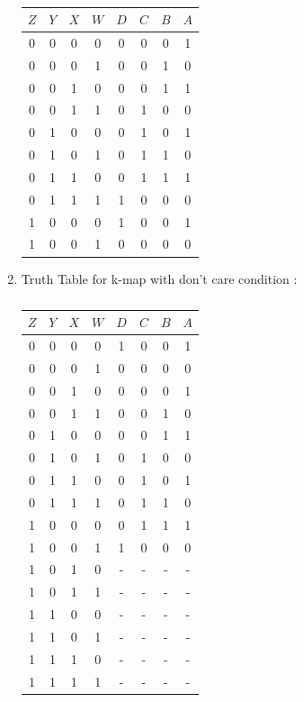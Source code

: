 \documentclass[conference]{IEEEtran}
\begin{document}
\begin{enumerate}
\begin{table}[htbp]
    \centering
\begin{tabular}
{ | c | c | c | c | c | c | c | c | } \hline
$Z$ & $Y$ & $X$ & $W$ & $D$ & $C$ & $B$ & $A$\\\hline
0   & 0   & 0   & 0   & 0  & 0 & 0  & 1 \\
0   & 0   & 0   & 1   & 0  & 0 & 1  & 0 \\
0   & 0   & 1   & 0   & 0  & 0 & 1  & 1 \\
0   & 0   & 1   & 1   & 0  & 1 & 0  & 0 \\
0   & 1   & 0   & 0   & 0  & 1 & 0  & 1 \\  
0   & 1   & 0   & 1   & 0  & 1 & 1  & 0 \\
0   & 1   & 1   & 0   & 0  & 1 & 1  & 1 \\  
0   & 1   & 1   & 1   & 1  & 0 & 0  & 0 \\
1   & 0   & 0   & 0   & 1  & 0 & 0  & 1 \\
1   & 0   & 0   & 1   & 0  & 0 & 0  & 0 \\ \hline
\end{tabular}
\vspace{0.1cm}
\caption{\label{tab:widgets}}
\end{table}

\item {Truth Table for k-map with don't care condition : }

\begin{table}[htbp]
    \centering
\begin{tabular}
{ | c | c | c | c | c | c | c | c | } \hline
$Z$ & $Y$ & $X$ & $W$ & $D$ & $C$ & $B$ & $A$\\\hline
0   & 0   & 0   & 0   & 1  & 0 & 0  & 1 \\
0   & 0   & 0   & 1   & 0  & 0 & 0  & 0 \\
0   & 0   & 1   & 0   & 0  & 0 & 0  & 1 \\
0   & 0   & 1   & 1   & 0  & 0 & 1  & 0 \\
0   & 1   & 0   & 0   & 0  & 0 & 1  & 1 \\  
0   & 1   & 0   & 1   & 0  & 1 & 0  & 0 \\
0   & 1   & 1   & 0   & 0  & 1 & 0  & 1 \\  
0   & 1   & 1   & 1   & 0  & 1 & 1  & 0 \\
1   & 0   & 0   & 0   & 0  & 1 & 1  & 1 \\
1   & 0   & 0   & 1   & 1  & 0 & 0  & 0 \\
1   & 0   & 1   & 0   & -  & - & -  & - \\ 
1   & 0   & 1   & 1   & -  & - & -  & - \\
1   & 1   & 0   & 0   & -  & - & -  & - \\
1   & 1   & 0   & 1   & -  & - & -  & - \\
1   & 1   & 1   & 0   & -  & - & -  & - \\
1   & 1   & 1   & 1   & -  & - & -  & - \\ \hline
\end{tabular}
\vspace{0.1cm}
\caption{\label{tab:widgets}}
\end{table}
	

\end{enumerate}
\end{document}
